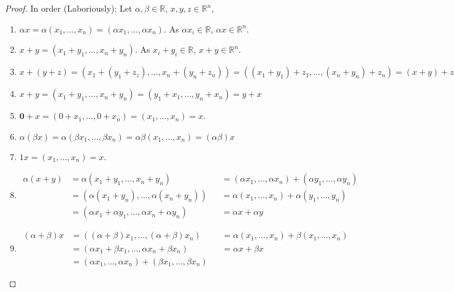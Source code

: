 \documentclass[crop=false,class=book,oneside]{standalone}
\begin{document}
            \begin{proof}
            In order (Laboriously): Let $\alpha, \beta \in \mathbb{R}$, $x,y,z\in \mathbb{R}^n$,
            \begin{enumerate}
            \item $\alpha x = \alpha(x_1,\hdots,x_n) = (\alpha x_1,\hdots, \alpha x_n)$. As $\alpha x_i \in \mathbb{R}$, $\alpha x \in \mathbb{R}^n$.
            \item $x+y = (x_1+y_1,\hdots,x_n+y_n)$. As $x_i+y_i \in \mathbb{R}$, $x+y\in \mathbb{R}^n$.
            \item $x+(y+z) = (x_1+(y_1+z_z),\hdots, x_n+(y_n+z_n)) = ((x_1+y_1)+z_1,\hdots, (x_n+y_n)+z_n) = (x+y)+z$
            \item $x+y = (x_1+y_1,\hdots,x_n+y_n) = (y_1+x_1,\hdots, y_n+x_n)=y+x$
            \item $\mathbf{0}+x = (0+x_1,\hdots, 0+x_n) = (x_1,\hdots, x_n) = x$.
            \item $\alpha(\beta x) = \alpha(\beta x_1,\hdots, \beta x_n) = \alpha \beta (x_1,\hdots, x_n) = (\alpha \beta) x$
            \item $1 x = (x_1,\hdots, x_n) = x$.
            \item
                \begin{align*}
                    \alpha(x+y) &= \alpha(x_1+y_1,\hdots, x_n+y_n) & &= (\alpha x_1, \hdots, \alpha x_n) + (\alpha y_1,\hdots, \alpha y_n)\\
                    &= (\alpha(x_1+y_n),\hdots, \alpha(x_n+y_n)) & &= \alpha(x_1,\hdots, x_n)+\alpha(y_1,\hdots, y_n)\\
                    &= (\alpha x_1+\alpha y_1,\hdots, \alpha x_n + \alpha y_n) & &= \alpha x + \alpha y
                \end{align*} 
            \item
                \begin{align*}
                    (\alpha + \beta)x &= ((\alpha+\beta)x_1,\hdots, (\alpha+\beta)x_n) & &= \alpha (x_1, \hdots, x_n)+\beta (x_1, \hdots, x_n)\\
                    &= (\alpha x_1 + \beta x_1,\hdots, \alpha x_n + \beta x_n) & &= \alpha x+\beta x\\
                    &= (\alpha x_1,\hdots, \alpha x_n) + (\beta x_1,\hdots, \beta x_n)
                \end{align*}
            \end{enumerate}
            \end{proof}
\end{document}
